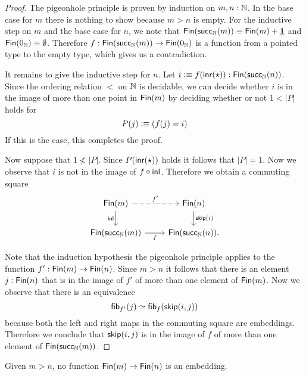 \begin{proof}
  The pigeonhole principle is proven by induction on $m,n:{\mathbb{N}}$. In the base case for $m$ there is nothing to show because $m>n$ is empty. For the inductive step on $m$ and the base case for $n$, we note that $\mathsf{Fin}(\mathsf{succ}_{{\mathbb{N}}}(m))\equiv \mathsf{Fin}(m)+\underline{\mathbf{1}}$ and $\mathsf{Fin}(0_{{\mathbb{N}}})\equiv \emptyset$. Therefore $f:\mathsf{Fin}(\mathsf{succ}_{{\mathbb{N}}}(m))\to\mathsf{Fin}(0_{{\mathbb{N}}})$ is a function from a pointed type to the empty type, which gives us a contradiction.

  It remains to give the inductive step for $n$. Let $i\vcentcolon\equiv f({\mathsf{inr}}(\star)):\mathsf{Fin}(\mathsf{succ}_{{\mathbb{N}}}(n))$. Since the ordering relation $<$ on ${\mathbb{N}}$ is decidable, we can decide whether $i$ is in the image of more than one point in $\mathsf{Fin}(m)$ by deciding whether or not $1<|P|$ holds for
  \begin{equation*}
    P(j)\vcentcolon\equiv (f(j)=i)
  \end{equation*}
  If this is the case, this completes the proof.

  Now suppose that $1\not<|P|$. Since $P({\mathsf{inr}}(\star))$ holds it follows that $|P|=1$. Now we observe that $i$ is not in the image of $f\circ {\mathsf{inl}}$. Therefore we obtain a commuting square
  \begin{equation*}
    \begin{tikzcd}
      \Fin(m) \arrow[r,densely dotted,"{f'}"] \arrow[d,swap,"\inl"] & \Fin(n) \arrow[d,"{\skipFin(i)}"] \\
      \Fin(\succN(m)) \arrow[r,swap,"f"] & \Fin(\succN(n)).
    \end{tikzcd}
  \end{equation*}

  Note that the induction hypothesis the pigeonhole principle applies to the function $f':\mathsf{Fin}(m)\to\mathsf{Fin}(n)$. Since $m>n$ it follows that there is an element $j:\mathsf{Fin}(n)$ that is in the image of $f'$ of more than one element of $\mathsf{Fin}(m)$. Now we observe that there is an equivalence
  \begin{equation*}
    \mathsf{fib}_{f'}(j)\simeq \mathsf{fib}_{f}(\mathsf{skip}(i,j))
  \end{equation*}
  because both the left and right maps in the commuting square are embeddings. Therefore we conclude that $\mathsf{skip}(i,j)$ is in the image of $f$ of more than one element of $\mathsf{Fin}(\mathsf{succ}_{{\mathbb{N}}}(m))$. 
 \end{proof}

\begin{cor}\label{cor:pigeonhole}
  Given $m>n$, no function $\mathsf{Fin}(m)\to\mathsf{Fin}(n)$ is an embedding.
\end{cor}

